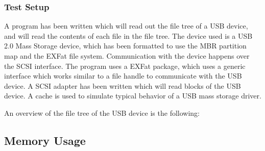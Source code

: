 \subsubsection{Test Setup}
A program has been written which will read out the file tree of a USB device, and will read the contents of each file in the file tree. The device used is a USB 2.0 Mass Storage device, which has been formatted to use the MBR partition map and the EXFat file system. Communication with the device happens over the SCSI interface. The program uses a EXFat package, which uses a generic interface which works similar to a file handle to communicate with the USB device. A SCSI adapter has been written which will read blocks of the USB device. A cache is used to simulate typical behavior of a USB mass storage driver.

An overview of the file tree of the USB device is the following:


\subsection{Memory Usage}
 